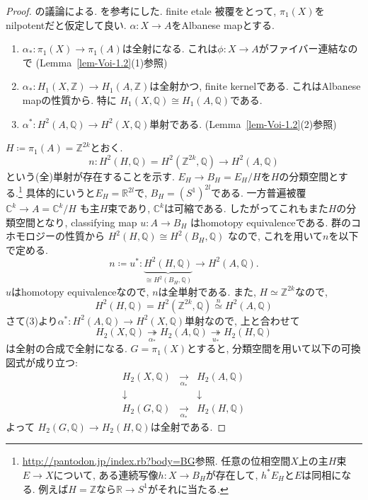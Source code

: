 \documentclass[dvipdfmx,a4paper,11pt]{article} %
\theoremstyle{definition}
\theoremstyle{remark}
\numberwithin{equation}{section}
\newcommand{\R}{\mathbb{R}}
\newcommand{\Z}{\mathbb{Z}}
\newcommand{\C}{\mathbb{C}}
\newcommand{\Q}{\mathbb{Q}}
\begin{document}
\begin{proof}
\cite{Cam95a}の議論による. \cite[Theorem 3.23]{Voi}を参考にした. 
finite etale 被覆をとって, $\pi_1(X)$をnilpotentだと仮定して良い. 
$\alpha : X \to A$をAlbanese mapとする. 
 \begin{enumerate}
 \item \(\alpha_* \colon \pi_1(X) \to \pi_1(A)\)は全射になる. これは\( \phi \colon X \to A\)がファイバー連結なので (Lemma~\ref{lem-Voi-1.2}(1)参照)
\item  \( \alpha_* \colon H_1(X, \mathbb{Z}) \to H_1(A, \mathbb{Z}) \)は全射かつ, finite kernelである. これはAlbanese mapの性質から. 特に $H_1(X, \mathbb{Q})  \cong H_1(A, \mathbb{Q}) $である. 
\item \( \alpha^* \colon H^2(A, \mathbb{Q}) \to H^2(X, \mathbb{Q}) \)単射である. (Lemma~\ref{lem-Voi-1.2}(2)参照)
\end{enumerate}

\( H \coloneqq  \pi_1(A) =\Z^{2k}\)とおく.
\[
n\colon H^2(H, \mathbb{Q}) =H^2(\Z^{2k}, \Q)\to H^2(A, \mathbb{Q})
\]
という(全)単射が存在することを示す. 
\(E_H \to B_H = E_H / H\)を$H$の分類空間とする.\footnote{\url{http://pantodon.jp/index.rb?body=BG}参照. 任意の位相空間$X$上の主$H$束$E \to X$について, ある連続写像$h \colon X \to B_H$が存在して, $h^{*}E_H$と$E$は同相になる. 例えば$H=\Z$なら$\R\to S^1$がそれに当たる. } 
具体的にいうと\(E_H=\R^{2l}\)で, $B_H=(S^1)^{2l}$である. 
一方普遍被覆
\(
\C^k\to A=\C^k/H
\)
も主$H$束であり, $\C^k$は可縮である. 
したがってこれもまた$H$の分類空間となり, classifying map
\(
u\colon A\to B_H
\)
はhomotopy equivalenceである. 
群のコホモロジーの性質から
\(
H^2(H,\Q)\cong H^2(B_H,\Q)
\)
なので, これを用いて$n$を以下で定める.
\[
n\coloneqq u^{*} \colon \underbrace{H^2(H,\Q)}_{\cong H^2(B_H, \mathbb{Q})} \to H^2(A, \mathbb{Q}).
\]
$u$はhomotopy equivalenceなので, $n$は全単射である. 
また, $H\simeq\Z^{2k}$なので,
\[
H^2(H,\Q)
=
H^2(\Z^{2k},\Q)
\overset{n}{\simeq}
H^2(A,\Q)
\]
さて(3)より\( \alpha^* \colon H^2(A, \mathbb{Q}) \to H^2(X, \mathbb{Q}) \)単射なので, 上と合わせて
 \[  
 H_2(X, \mathbb{Q}) \underset{\alpha_*}{\twoheadrightarrow} 
  H_2(A, \mathbb{Q}) \underset{u_{*}}{\twoheadrightarrow} 
 H_2(H, \mathbb{Q}) 
 \]
 は全射の合成で全射になる. 
 \( G = \pi_1(X) \)とすると, 分類空間を用いて以下の可換図式が成り立つ:
\[
\begin{array}{ccc}
H_2(X, \mathbb{Q}) & \underset{\alpha_*}{\longrightarrow}& H_2(A, \mathbb{Q}) \\
\downarrow & & \downarrow \\
H_2(G, \mathbb{Q}) & \underset{\alpha_*}{\longrightarrow} & H_2(H, \mathbb{Q})
\end{array}
\]
よって  \(H_2(G, \mathbb{Q}) \to H_2(H, \mathbb{Q}) \)は全射である. 


\end{proof}
\end{document}
